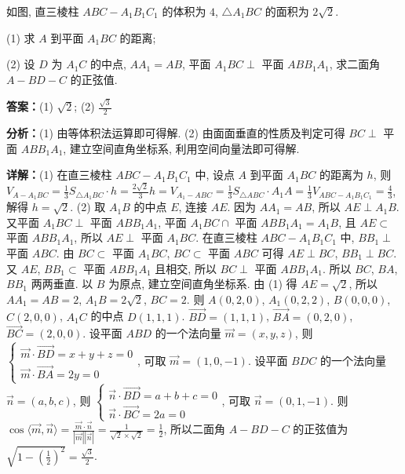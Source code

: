 \begin{question}[points=12]
如图, 直三棱柱 $ABC - A_1B_1C_1$ 的体积为 $4$, $\triangle A_1BC$ 的面积为 $2\sqrt{2}$.

(1) 求 $A$ 到平面 $A_1BC$ 的距离;

(2) 设 $D$ 为 $A_1C$ 的中点, $AA_1 = AB$, 平面 $A_1BC \perp$ 平面 $ABB_1A_1$, 求二面角 $A - BD - C$ 的正弦值.
\begin{solution}
\textbf{答案：}(1) $\sqrt{2}$; (2) $\frac{\sqrt{3}}{2}$

\textbf{分析：}(1) 由等体积法运算即可得解. (2) 由面面垂直的性质及判定可得 $BC \perp$ 平面 $ABB_1A_1$, 建立空间直角坐标系, 利用空间向量法即可得解.

\textbf{详解：}(1) 在直三棱柱 $ABC - A_1B_1C_1$ 中, 设点 $A$ 到平面 $A_1BC$ 的距离为 $h$, 则 $V_{A-A_1BC} = \frac{1}{3}S_{\triangle A_1BC} \cdot h = \frac{2\sqrt{2}}{3}h = V_{A_1-ABC} = \frac{1}{3}S_{\triangle ABC} \cdot A_1A = \frac{1}{3}V_{ABC-A_1B_1C_1} = \frac{4}{3}$, 解得 $h = \sqrt{2}$.
(2) 取 $A_1B$ 的中点 $E$, 连接 $AE$. 因为 $AA_1 = AB$, 所以 $AE \perp A_1B$. 又平面 $A_1BC \perp$ 平面 $ABB_1A_1$, 平面 $A_1BC \cap$ 平面 $ABB_1A_1 = A_1B$, 且 $AE \subset$ 平面 $ABB_1A_1$, 所以 $AE \perp$ 平面 $A_1BC$. 在直三棱柱 $ABC - A_1B_1C_1$ 中, $BB_1 \perp$ 平面 $ABC$. 由 $BC \subset$ 平面 $A_1BC$, $BC \subset$ 平面 $ABC$ 可得 $AE \perp BC$, $BB_1 \perp BC$. 又 $AE$, $BB_1 \subset$ 平面 $ABB_1A_1$ 且相交, 所以 $BC \perp$ 平面 $ABB_1A_1$. 所以 $BC$, $BA$, $BB_1$ 两两垂直. 以 $B$ 为原点, 建立空间直角坐标系. 由 (1) 得 $AE = \sqrt{2}$, 所以 $AA_1 = AB = 2$, $A_1B = 2\sqrt{2}$, $BC = 2$. 则 $A(0,2,0)$, $A_1(0,2,2)$, $B(0,0,0)$, $C(2,0,0)$, $A_1C$ 的中点 $D(1,1,1)$. $\overrightarrow{BD} = (1,1,1)$, $\overrightarrow{BA} = (0,2,0)$, $\overrightarrow{BC} = (2,0,0)$. 设平面 $ABD$ 的一个法向量 $\vec{m} = (x,y,z)$, 则 $\begin{cases} \vec{m} \cdot \overrightarrow{BD} = x + y + z = 0 \\ \vec{m} \cdot \overrightarrow{BA} = 2y = 0 \end{cases}$, 可取 $\vec{m} = (1,0,-1)$. 设平面 $BDC$ 的一个法向量 $\vec{n} = (a,b,c)$, 则 $\begin{cases} \vec{n} \cdot \overrightarrow{BD} = a + b + c = 0 \\ \vec{n} \cdot \overrightarrow{BC} = 2a = 0 \end{cases}$, 可取 $\vec{n} = (0,1,-1)$. 则 $\cos\langle\vec{m},\vec{n}\rangle = \frac{\vec{m} \cdot \vec{n}}{|\vec{m}| |\vec{n}|} = \frac{1}{\sqrt{2} \times \sqrt{2}} = \frac{1}{2}$, 所以二面角 $A - BD - C$ 的正弦值为 $\sqrt{1 - \left(\frac{1}{2}\right)^2} = \frac{\sqrt{3}}{2}$.
\end{solution}
\end{question}

